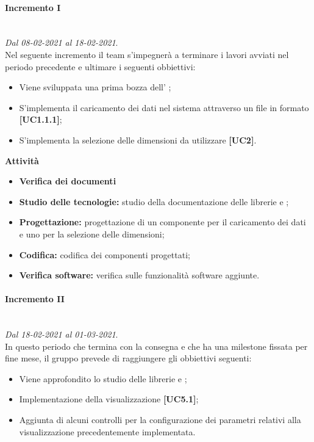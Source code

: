 \paragraph{Incremento I} \textit{}\\ \textit{Dal 08-02-2021 al 18-02-2021}. \\ Nel seguente incremento il team s'impegnerà a terminare i lavori avviati nel periodo precedente e ultimare i seguenti obbiettivi:
		\begin{itemize}
			\item Viene sviluppata una prima bozza dell' ;
			\item S'implementa il caricamento dei dati nel sistema attraverso un file in formato  \textbf{[UC1.1.1]};
			\item S'implementa la selezione delle dimensioni da utilizzare \textbf{[UC2]}.
		\end{itemize}	
		
\textbf{Attività}			

\begin{itemize}
\item \textbf{Verifica dei documenti}
\item \textbf{Studio delle tecnologie:} studio della documentazione delle librerie  e ;
\item \textbf{Progettazione:} progettazione di un componente per il caricamento dei dati e uno per la selezione delle dimensioni;
\item \textbf{Codifica:} codifica dei componenti progettati;
\item \textbf{Verifica software:} verifica sulle funzionalità software aggiunte.
\end{itemize}

\paragraph{Incremento II} \textit{}\\ \textit{Dal 18-02-2021 al 01-03-2021}.\\ In questo periodo che termina con la consegna e che ha una milestone fissata per fine mese, il gruppo prevede di raggiungere gli obbiettivi seguenti:
		\begin{itemize}
			\item Viene approfondito lo studio delle librerie  e ;
			\item Implementazione della visualizzazione  \textbf{[UC5.1]};
			\item Aggiunta di alcuni controlli per la configurazione dei parametri relativi alla visualizzazione precedentemente implementata. 
		\end{itemize}			
	

